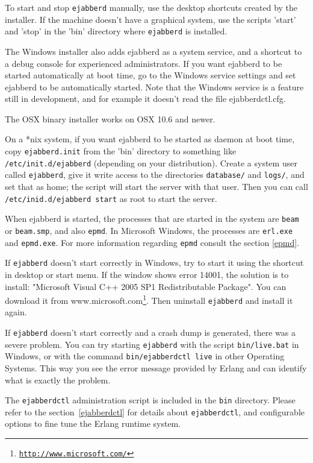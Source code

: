 \documentclass[a4paper,10pt]{book}
\newcommand{\term}[1]{\texttt{#1}}
\newcommand{\ejabberd}{\texttt{ejabberd}}
\gdef\footahref#1#2{#2\footnote{\href{#1}{\texttt{#1}}}}
\begin{document}
To start and stop \ejabberd{} manually,
use the desktop shortcuts created by the installer.
If the machine doesn't have a graphical system, use the scripts 'start'
and 'stop' in the 'bin' directory where \ejabberd{} is installed.

The Windows installer also adds ejabberd as a system service,
and a shortcut to a debug console for experienced administrators.
If you want ejabberd to be started automatically at boot time,
go to the Windows service settings and set ejabberd to be automatically started.
Note that the Windows service is a feature still in development,
and for example it doesn't read the file ejabberdctl.cfg.

The OSX binary installer works on OSX 10.6 and newer.

On a *nix system, if you want ejabberd to be started as daemon at boot time,
copy \term{ejabberd.init} from the 'bin' directory to something like \term{/etc/init.d/ejabberd}
(depending on your distribution).
Create a system user called \term{ejabberd},
give it write access to the directories \term{database/} and \term{logs/}, and set that as home;
the script will start the server with that user.
Then you can call \term{/etc/inid.d/ejabberd start} as root to start the server.

When ejabberd is started, the processes that are started in the system
are \term{beam} or \term{beam.smp}, and also \term{epmd}.
In Microsoft Windows, the processes are \term{erl.exe} and \term{epmd.exe}.
For more information regarding \term{epmd} consult the section \ref{epmd}.

If \term{ejabberd} doesn't start correctly in Windows,
try to start it using the shortcut in desktop or start menu.
If the window shows error 14001, the solution is to install:
"Microsoft Visual C++ 2005 SP1 Redistributable Package".
You can download it from
\footahref{http://www.microsoft.com/}{www.microsoft.com}.
Then uninstall \ejabberd{} and install it again.

If \term{ejabberd} doesn't start correctly and a crash dump is generated,
there was a severe problem.
You can try starting \term{ejabberd} with
the script \term{bin/live.bat} in Windows,
or with the command \term{bin/ejabberdctl live} in other Operating Systems.
This way you see the error message provided by Erlang
and can identify what is exactly the problem.

The \term{ejabberdctl} administration script is included in the \term{bin} directory.
Please refer to the section~\ref{ejabberdctl} for details about \term{ejabberdctl},
and configurable options to fine tune the Erlang runtime system.
\end{document}
